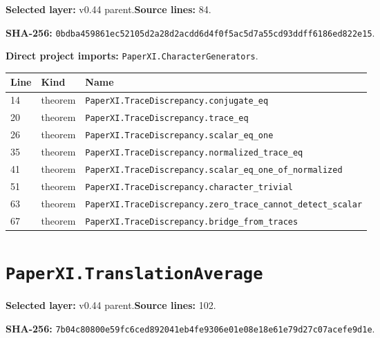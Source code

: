 \documentclass[10pt,oneside]{book}
\begin{document}
\textbf{Selected layer:} v0.44 parent.\quad\textbf{Source lines:} 84.\par\textbf{SHA-256:} {\scriptsize\nolinkurl{0bdba459861ec52105d2a28d2acdd6d4f0f5ac5d7a55cd93ddff6186ed822e15}}.


\textbf{Direct project imports:} \nolinkurl{PaperXI.CharacterGenerators}.

\begin{longtable}{@{}p{}p{}p{}@{}}\toprule Line&Kind&Name\\\midrule\endhead

14&theorem&\nolinkurl{PaperXI.TraceDiscrepancy.conjugate_eq}\\

20&theorem&\nolinkurl{PaperXI.TraceDiscrepancy.trace_eq}\\

26&theorem&\nolinkurl{PaperXI.TraceDiscrepancy.scalar_eq_one}\\

35&theorem&\nolinkurl{PaperXI.TraceDiscrepancy.normalized_trace_eq}\\

41&theorem&\nolinkurl{PaperXI.TraceDiscrepancy.scalar_eq_one_of_normalized}\\

51&theorem&\nolinkurl{PaperXI.TraceDiscrepancy.character_trivial}\\

63&theorem&\nolinkurl{PaperXI.TraceDiscrepancy.zero_trace_cannot_detect_scalar}\\

67&theorem&\nolinkurl{PaperXI.TraceDiscrepancy.bridge_from_traces}\\

\bottomrule\end{longtable}

\section{\texorpdfstring{\nolinkurl{PaperXI.TranslationAverage}}{PaperXI.TranslationAverage}}\label{module:PaperXI.TranslationAverage}

\textbf{Selected layer:} v0.44 parent.\quad\textbf{Source lines:} 102.\par\textbf{SHA-256:} {\scriptsize\nolinkurl{7b04c80800e59fc6ced892041eb4fe9306e01e08e18e61e79d27c07acefe9d1e}}.
\end{document}
